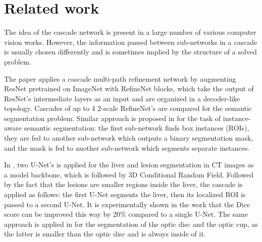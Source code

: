 \documentclass{llncs}
\begin{document}
\section{Related work}


The idea of the cascade network is present in a large number of  various computer vision works. However, the information passed between sub-networks in a cascade is usually chosen differently and is sometimes implied by the structure of a solved problem.

The paper \cite{lin2017refinenet} applies a cascade multi-path refinement network by augmenting ResNet \cite{resnet} pretrained on ImageNet \cite{imagenet} with RefineNet blocks, which take the output of ResNet’s intermediate layers as an input and are organized in a decoder-like topology. Cascades of up to 4 2-scale RefineNet's are compared for the semantic segmentation problem. %
Similar approach is proposed in \cite{dai2016instance} for the task of instance-aware semantic segmentation: the first sub-network finds box instances (ROIs), they are fed to another sub-network which outputs a binary segmentation mask, and the mask is fed to another sub-network which segments separate instances.
	
In \cite{christ2016automatic}, two U-Net’s is applied for the liver and lesion segmentation in CT images as a model backbone, which is followed by 3D Conditional Random Field. Followed by the fact that the lesions are smaller regions inside the liver, the cascade is applied as follows: the first U-Net segments the liver, then its localized ROI is passed to a second U-Net. It is experimentally shown in the work that the Dice score can be improved this way by 20\% compared to a single U-Net. The same approach is applied in \cite{sevastopolsky2017optic} for the segmentation of the optic disc and the optic cup, as the latter is smaller than the optic disc and is always inside of it.
\end{document}
